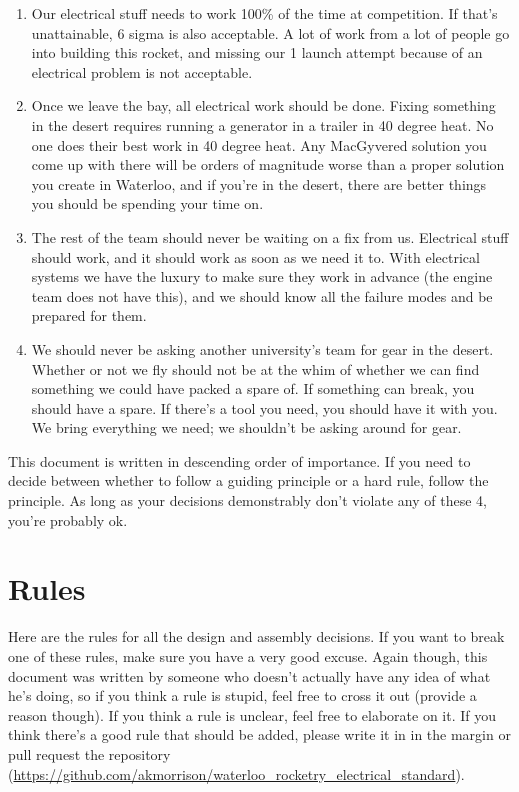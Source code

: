 \documentclass{article}
\begin{document}
\begin{enumerate}
\item Our electrical stuff needs to work 100\% of the time at competition. If that's unattainable, 6 sigma is also acceptable. A lot of work from a lot of people go into building this rocket, and missing our 1 launch attempt because of an electrical problem is not acceptable.
\item Once we leave the bay, all electrical work should be done. Fixing something in the desert requires running a generator in a trailer in 40 degree heat. No one does their best work in 40 degree heat. Any MacGyvered solution you come up with there will be orders of magnitude worse than a proper solution you create in Waterloo, and if you're in the desert, there are better things you should be spending your time on.
\item The rest of the team should never be waiting on a fix from us. Electrical stuff should work, and it should work as soon as we need it to. With electrical systems we have the luxury to make sure they work in advance (the engine team does not have this), and we should know all the failure modes and be prepared for them. 
\item We should never be asking another university's team for gear in the desert. Whether or not we fly should not be at the whim of whether we can find something we could have packed a spare of. If something can break, you should have a spare. If there's a tool you need, you should have it with you. We bring everything we need; we shouldn't be asking around for gear.
\end{enumerate}
This document is written in descending order of importance. If you need to decide between whether to follow a guiding principle or a hard rule, follow the principle. As long as your decisions demonstrably don't violate any of these 4, you're probably ok.

\section{Rules}
Here are the rules for all the design and assembly decisions. If you want to break one of these rules, make sure you have a very good excuse. Again though, this document was written by someone who doesn't actually have any idea of what he's doing, so if you think a rule is stupid, feel free to cross it out (provide a reason though). If you think a rule is unclear, feel free to elaborate on it. If you think there's a good rule that should be added, please write it in in the margin or pull request the repository \newline(\url{https://github.com/akmorrison/waterloo\_rocketry\_electrical\_standard}).
\end{document}
